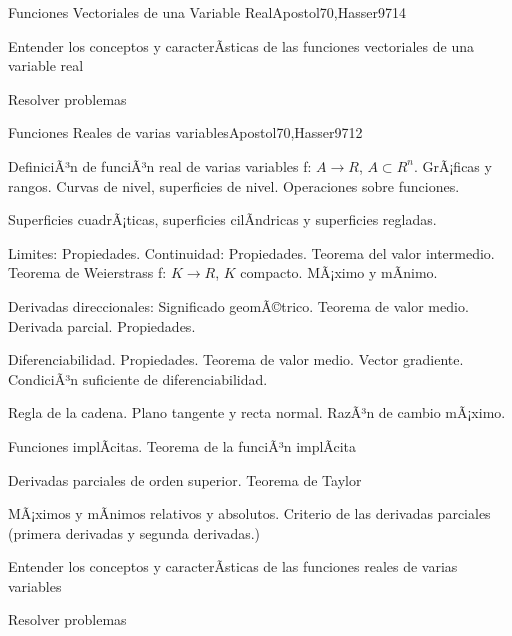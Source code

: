\begin{syllabus}
\begin{unit}{Funciones Vectoriales de una Variable Real}{Apostol70,Hasser97}{14}
   \begin{unitgoals}
         \item  Entender los conceptos y caracterÃ­sticas de las funciones vectoriales de una variable real
         \item  Resolver problemas
   \end{unitgoals}
\end{unit}

\begin{unit}{Funciones Reales de varias variables}{Apostol70,Hasser97}{12}
   \begin{topics}
	\item  DefiniciÃ³n de funciÃ³n real de varias variables f: $A \rightarrow R$, $A \subset R^n$. GrÃ¡ficas y rangos. Curvas de nivel, superficies de nivel. Operaciones sobre funciones.
	\item  Superficies cuadrÃ¡ticas, superficies cilÃ­ndricas y superficies regladas.
	\item  Limites: Propiedades. Continuidad: Propiedades. Teorema del valor intermedio. Teorema de Weierstrass f: $K \rightarrow R$, $K$ compacto. MÃ¡ximo y mÃ­nimo.
	\item  Derivadas direccionales: Significado geomÃ©trico. Teorema de valor medio. Derivada parcial. Propiedades.
	\item  Diferenciabilidad. Propiedades. Teorema de valor medio. Vector gradiente. CondiciÃ³n suficiente de diferenciabilidad.
	\item  Regla de la cadena. Plano tangente y recta normal. RazÃ³n de cambio mÃ¡ximo.
	\item Funciones implÃ­citas. Teorema de la funciÃ³n implÃ­cita
	\item Derivadas parciales de orden superior. Teorema de Taylor
	\item MÃ¡ximos y mÃ­nimos relativos y absolutos. Criterio de las derivadas parciales (primera derivadas y segunda derivadas.)
   \end{topics}

   \begin{unitgoals}
         \item  Entender los conceptos y caracterÃ­sticas de las funciones reales de varias variables
         \item  Resolver problemas
   \end{unitgoals}
\end{unit}


\end{syllabus}
